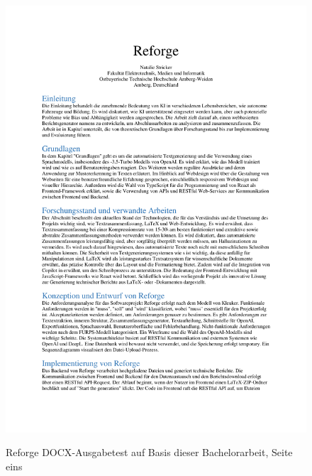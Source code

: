 \begin{figure}[H]
\centering
\includegraphics[width=0.9\linewidth]{Images/ReforgeDOCXGen1.pdf}\\
\caption{Reforge \ac{DOCX}-Ausgabetest auf Basis dieser Bachelorarbeit, Seite eins}
\label{fig:ReforgeDOCXGen1}
\end{figure}

